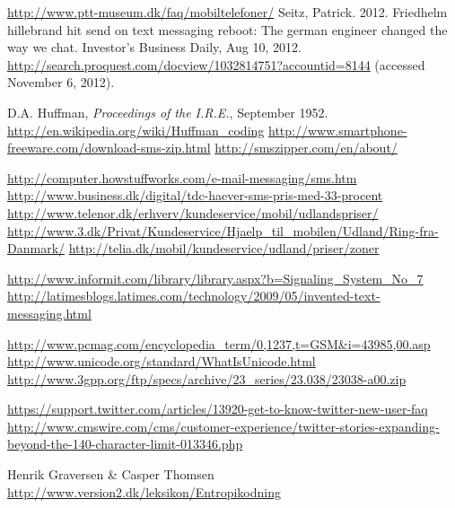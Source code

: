  {\url{http://www.ptt-museum.dk/faq/mobiltelefoner/}}
 Seitz, Patrick. 2012. Friedhelm hillebrand hit send on text messaging reboot: The german engineer changed the way we chat. Investor's Business Daily, Aug 10, 2012. \url{http://search.proquest.com/docview/1032814751?accountid=8144} (accessed November 6, 2012).

 D.A. Huffman, {\it Proceedings of the I.R.E.}, September 1952.
 {\url{http://en.wikipedia.org/wiki/Huffman_coding}}
 {\url{http://www.smartphone-freeware.com/download-sms-zip.html}}
 {\url{http://smszipper.com/en/about/}}

 {\url{http://computer.howstuffworks.com/e-mail-messaging/sms.htm}}
 {\url{http://www.business.dk/digital/tdc-haever-sms-pris-med-33-procent}}
 {\url{http://www.telenor.dk/erhverv/kundeservice/mobil/udlandspriser/}}
 {\url{http://www.3.dk/Privat/Kundeservice/Hjaelp_til_mobilen/Udland/Ring-fra-Danmark/}}
 {\url{http://telia.dk/mobil/kundeservice/udland/priser/zoner}}

 {\url{http://www.informit.com/library/library.aspx?b=Signaling_System_No_7}}
 {\url{http://latimesblogs.latimes.com/technology/2009/05/invented-text-messaging.html}}

 {\url{http://www.pcmag.com/encyclopedia_term/0,1237,t=GSM&i=43985,00.asp}}
 {\url{http://www.unicode.org/standard/WhatIsUnicode.html}}
 {\url{http://www.3gpp.org/ftp/specs/archive/23_series/23.038/23038-a00.zip}}


 {\url{https://support.twitter.com/articles/13920-get-to-know-twitter-new-user-faq}}
 {\url{http://www.cmswire.com/cms/customer-experience/twitter-stories-expanding-beyond-the-140-character-limit-013346.php}}


 Henrik Graversen \& Casper Thomsen {\url{http://www.version2.dk/leksikon/Entropikodning}}




